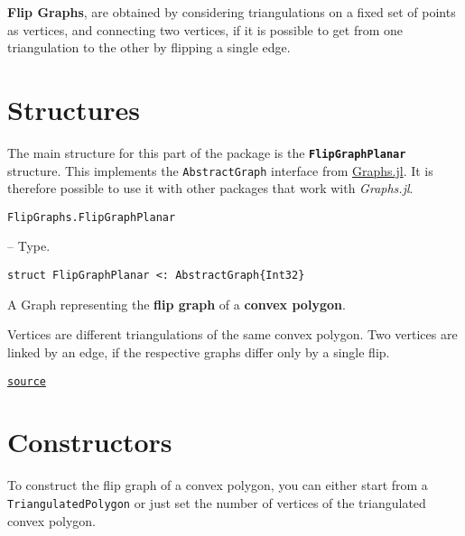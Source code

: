 \label{5007793054777268130}{}


\textbf{Flip Graphs}, are obtained by considering triangulations on a fixed set of points as vertices, and connecting two vertices, if it is possible to get from one triangulation to the other by flipping a single edge.



\section{Structures}



\label{15035490444877811912}{}


The main structure for this part of the package is the \textbf{\texttt{FlipGraphPlanar}} structure.  This implements the \texttt{AbstractGraph} interface from \href{https://juliagraphs.org/Graphs.jl/stable/}{Graphs.jl}.  It is therefore possible to use it with other packages that work with \emph{Graphs.jl}.


\hypertarget{10784171746981031091}{\texttt{FlipGraphs.FlipGraphPlanar}}  -- {Type.}

\begin{adjustwidth}{2em}{0pt}


\begin{verbatim}
struct FlipGraphPlanar <: AbstractGraph{Int32}
\end{verbatim}

A Graph representing the \textbf{flip graph} of a \textbf{convex polygon}. 

Vertices are different triangulations of the same convex polygon. Two vertices are linked by an edge, if the respective graphs differ only by a single flip.



\href{https://github.com/schto223/FlipGraphs.jl/blob/e35d43698a06b86273148826b79d585ba04fcd26/src/flipGraphPlanar.jl#L1-L8}{\texttt{source}}


\end{adjustwidth}

\section{Constructors}



\label{1468722345706912774}{}


To construct the flip graph of a convex polygon, you can either start from a \texttt{TriangulatedPolygon} or just set the number of vertices of the triangulated convex polygon.


